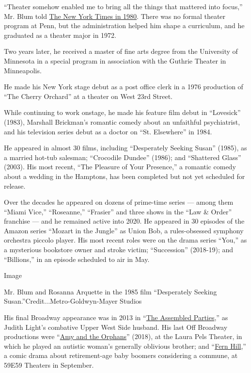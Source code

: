 ``Theater somehow enabled me to bring all the things that mattered into
focus,'' Mr. Blum told
\href{https://timesmachine.nytimes.com/timesmachine/1980/02/01/114019644.pdf?pdf_redirect=true\&ip=0}{The
New York Times in 1980}. There was no formal theater program at Penn,
but the administration helped him shape a curriculum, and he graduated
as a theater major in 1972.

Two years later, he received a master of fine arts degree from the
University of Minnesota in a special program in association with the
Guthrie Theater in Minneapolis.

He made his New York stage debut as a post office clerk in a 1976
production of ``The Cherry Orchard'' at a theater on West 23rd Street.

While continuing to work onstage, he made his feature film debut in
``Lovesick'' (1983), Marshall Brickman's romantic comedy about an
unfaithful psychiatrist, and his television series debut as a doctor on
``St. Elsewhere'' in 1984.

He appeared in almost 30 films, including ``Desperately Seeking Susan''
(1985), as a married hot-tub salesman; ``Crocodile Dundee'' (1986); and
``Shattered Glass'' (2003). His most recent, ``The Pleasure of Your
Presence,'' a romantic comedy about a wedding in the Hamptons, has been
completed but not yet scheduled for release.

Over the decades he appeared on dozens of prime-time series --- among
them ``Miami Vice,'' ``Roseanne,'' ``Frasier'' and three shows in the
``Law \& Order'' franchise --- and he remained active into 2020. He
appeared in 30 episodes of the Amazon series ``Mozart in the Jungle'' as
Union Bob, a rules-obsessed symphony orchestra piccolo player. His most
recent roles were on the drama series ``You,'' as a mysterious bookstore
owner and stroke victim; ``Succession'' (2018-19); and ``Billions,'' in
an episode scheduled to air in May.

Image

Mr. Blum and Rosanna Arquette in the 1985 film ``Desperately Seeking
Susan.''Credit...Metro-Goldwyn-Mayer Studios

His final Broadway appearance was in 2013 in
``\href{https://www.nytimes.com/2013/04/18/theater/reviews/the-assembled-parties-at-the-samuel-j-friedman-theater.html}{The
Assembled Parties},'' as Judith Light's combative Upper West Side
husband. His last Off Broadway productions were
``\href{https://www.nytimes.com/2018/03/01/theater/amy-and-the-orphans-review.html}{Amy
and the Orphans}'' (2018), at the Laura Pels Theater, in which he played
an autistic woman's generally oblivious brother; and
``\href{https://www.nytimes.com/2019/09/22/theater/fern-hill-review.html}{Fern
Hill},'' a comic drama about retirement-age baby boomers considering a
commune, at 59E59 Theaters in September.

